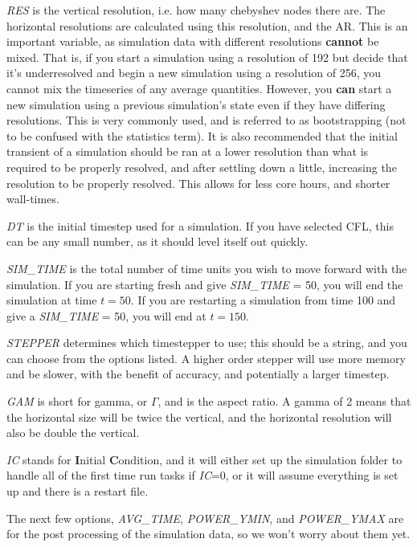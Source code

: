 \documentclass[12pt,a4paper]{report}
\begin{document}
	\textit{RES} is the vertical resolution, i.e. how many chebyshev nodes there are. The horizontal resolutions are calculated using this resolution, and the AR. This is an important variable, as simulation data with different resolutions \textbf{cannot} be mixed. That is, if you start a simulation using a resolution of 192 but decide that it's underresolved and begin a new simulation using a resolution of 256, you cannot mix the timeseries of any average quantities. However, you \textbf{can} start a new simulation using a previous simulation's state even if they have differing resolutions. This is very commonly used, and is referred to as bootstrapping (not to be confused with the statistics term). It is also recommended that the initial transient of a simulation should be ran at a lower resolution than what is required to be properly resolved, and after settling down a little, increasing the resolution to be properly resolved. This allows for less core hours, and shorter wall-times.

	\textit{DT} is the initial timestep used for a simulation. If you have selected CFL, this can be any small number, as it should level itself out quickly.

	\textit{SIM\_TIME} is the total number of time units you wish to move forward with the simulation. If you are starting fresh and give \textit{SIM\_TIME} = 50, you will end the simulation at time $t=50$. If you are restarting a simulation from time 100 and give a \textit{SIM\_TIME} = 50, you will end at $t=150$.

	\textit{STEPPER} determines which timestepper to use; this should be a string, and you can choose from the options listed. A higher order stepper will use more memory and be slower, with the benefit of accuracy, and potentially a larger timestep.

	\textit{GAM} is short for gamma, or $\Gamma$, and is the aspect ratio. A gamma of 2 means that the horizontal size will be twice the vertical, and the horizontal resolution will also be double the vertical.

	\textit{IC} stands for \textbf{I}nitial \textbf{C}ondition, and it will either set up the simulation folder to handle all of the first time run tasks if \textit{IC}=0, or it will assume everything is set up and there is a restart file.

	The next few options, \textit{AVG\_TIME}, \textit{POWER\_YMIN}, and \textit{POWER\_YMAX} are for the post processing of the simulation data, so we won't worry about them yet.
\end{document}
